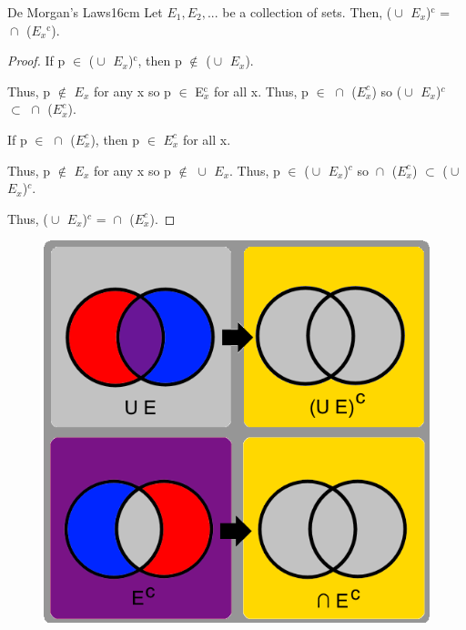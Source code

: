 	\vspace{0.5cm}



	\begin{wtheorem}{De Morgan's Laws}{16cm}
		Let $E_1, E_2 , ... $ be a collection of sets. Then,
		($\cup_{}^{}$ $E_x$)$^\text{c}$ = $\cap_{}^{}$ ($E_x$$^\text{c}$).		 
	\end{wtheorem}
	 
	\begin{proof}
		If p $\in$ ($\cup_{}^{}$ $E_x$)$^\text{c}$, then
		p $\not \in$ ($\cup_{}^{}$ $E_x$).

		Thus, p $\not \in$ $E_x$ for any x so p $\in$ E$_x^\text{c}$ for all x.
		Thus, p $\in$ $\cap_{}^{}$ ($E_x^c$) so
		($\cup_{}^{}$ $E_x$)$^c$ $\subset$ $\cap_{}^{}$ ($E_x^c$).

		If p $\in$ $\cap_{}^{}$ ($E_x^c$), then p $\in$ $E_x^c$ for all x.
		
		Thus, p $\not \in$ $E_x$ for any x so p $\not \in$ $\cup_{}^{}$ $E_x$.
		Thus, p $\in$ ($\cup_{}^{}$ $E_x$)$^c$ so
		$\cap_{}^{}$ ($E_x^c$) $\subset$ ($\cup_{}^{}$ $E_x$)$^c$.
		
		Thus, ($\cup_{}^{}$ $E_x$)$^c$ = $\cap_{}^{}$ ($E_x^c$). 
	\end{proof}



	\begin{figure}[h]
		\centering
		\includegraphics[scale=0.35]{Images/5.1.6.png}
	\end{figure}

